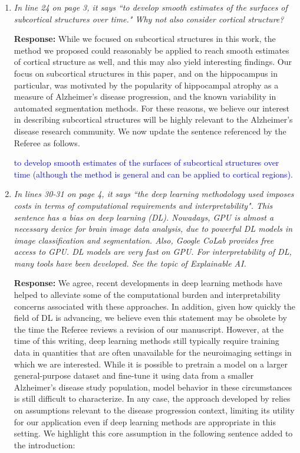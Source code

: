 \documentclass[12pt]{article}
\theoremstyle{definition}
\newcommand{\revision}[1]{\textcolor{blue}{#1}}
\begin{document}
\begin{enumerate}
\item \textit{In line 24 on page 3, it says ``to develop smooth estimates of the surfaces of subcortical structures over time." Why not also consider cortical structure?}

{\bf Response:}
While we focused on subcortical structures in this work, the method we proposed could reasonably be applied to reach smooth estimates of cortical structure as well, and this may also yield interesting findings. Our focus on subcortical structures in this paper, and on the hippocampus in particular, was motivated by the popularity of hippocampal atrophy as a measure of Alzheimer's disease progression, and the known variability in automated segmentation methods. For these reasons, we believe our interest in describing subcortical structures will be highly relevant to the Alzheimer's disease research community. We now update the sentence referenced by the Referee as follows. 

\revision{to develop smooth estimates of the surfaces of subcortical structures over time (although the method is general and can be applied to cortical regions).}

\item \textit{In lines 30-31 on page 4, it says ``the deep learning methodology used imposes costs in terms of computational requirements and interpretability". This sentence has a bias on deep learning (DL). Nowadays, GPU is almost a necessary device for brain image data analysis, due to powerful DL models in image classification and segmentation. Also, Google CoLab provides free access to GPU. DL models are very fast on GPU. For interpretability of DL, many tools have been developed. See the topic of Explainable AI.}

{\bf Response:} We agree, recent developments in deep learning methods have helped to alleviate some of the computational burden and interpretability concerns associated with these approaches. In addition, given how quickly the field of DL is advancing, we believe even this statement may be obsolete by the time the Referee reviews a revision of our manuscript. However, at the time of this writing, deep learning methods still typically require training data in quantities that are often unavailable for the neuroimaging settings in which we are interested. While it is possible to pretrain a model on a larger general-purpose dataset and fine-tune it using data from a smaller Alzheimer's disease study population, model behavior in these circumstances is still difficult to characterize. In any case, the approach developed by \cite{louis2019Riemannian} relies on assumptions relevant to the disease progression context, limiting its utility for our application even if deep learning methods are appropriate in this setting. We highlight this core assumption in the following sentence added to the introduction:


\end{enumerate}
\end{document}
